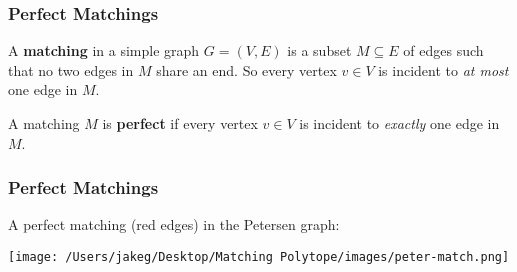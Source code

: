 \begin{frame}
\frametitle{Perfect Matchings}
A \textbf{matching} in a simple graph \( G = (V,E) \) is a subset \( M \subseteq E \) of edges such that no two edges in \( M \) share an end. \pause So every vertex \( v \in V \) is incident to \emph{at most} one edge in \( M \). \\
\pause
\vspace{0.3cm}

A matching \( M \) is \textbf{perfect} if every vertex \( v \in V \) is incident to \emph{exactly} one edge in \( M \). 
\end{frame}

\begin{frame}
\frametitle{Perfect Matchings}
A perfect matching (red edges) in the Petersen graph:
\begin{center}
\texttt{[image: /Users/jakeg/Desktop/Matching Polytope/images/peter-match.png]}
\end{center}
\end{frame}
